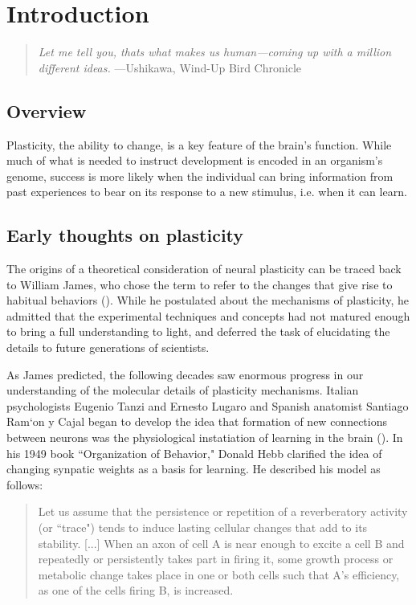 \chapter{Introduction}

\begin{quotation}
\textit{Let me tell you, thats what makes us human---coming up with a million \mbox{different} ideas.}
\newline{}
\newline{}
 ---Ushikawa, Wind-Up Bird Chronicle
\end{quotation}

\section{Overview}

Plasticity, the ability to change, is a key feature of the brain's function. While much of what is needed to instruct development is encoded in an organism's genome, success is more likely when the individual can bring information from past experiences to bear on its response to a new stimulus, i.e. when it can learn. 

\section{Early thoughts on plasticity}
The origins of a theoretical consideration of neural plasticity can be traced back to William James, who chose the term to refer to the changes that give rise to habitual behaviors (\cite{James1910, Berlucchi2009}). While he postulated about the mechanisms of plasticity, he admitted that the experimental techniques and concepts had not matured enough to bring a full understanding to light, and deferred the task of elucidating the details to future generations of scientists.

As James predicted, the following decades saw enormous progress in our understanding of the molecular details of plasticity mechanisms. Italian psychologists Eugenio Tanzi and Ernesto Lugaro and Spanish anatomist Santiago Ram\a`on y Cajal began to develop the idea that formation of new connections between neurons was the physiological instatiation of learning in the brain (\cite{Berlucchi2009}). In his 1949 book ``Organization of Behavior," Donald Hebb clarified the idea of changing synpatic weights as a basis for learning. He described his model as follows:

\begin{quotation}
Let us assume that the persistence or repetition of a reverberatory activity (or ``trace") tends to induce lasting cellular changes that add to its stability. [...] When an axon of cell A is near enough to excite a cell B and repeatedly or persistently takes part in firing it, some growth process or metabolic change takes place in one or both cells such that A's efficiency, as one of the cells firing B, is increased.
\end{quotation}


